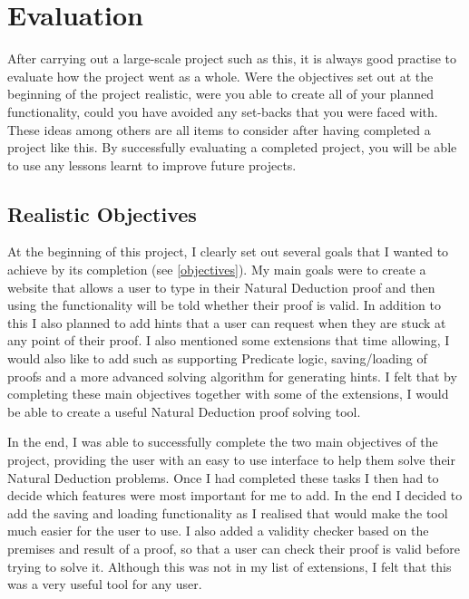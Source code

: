 \pagebreak

\section{Evaluation}

After carrying out a large-scale project such as this, it is always good practise to evaluate how the project went as a whole. Were the objectives set out at the beginning of the project realistic, were you able to create all of your planned functionality, could you have avoided any set-backs that you were faced with. These ideas among others are all items to consider after having completed a project like this. By successfully evaluating a completed project, you will be able to use any lessons learnt to improve future projects.

\subsection{Realistic Objectives}

At the beginning of this project, I clearly set out several goals that I wanted to achieve by its completion (see \ref{objectives}). My main goals were to create a website that allows a user to type in their Natural Deduction proof and then using the functionality will be told whether their proof is valid. In addition to this I also planned to add hints that a user can request when they are stuck at any point of their proof. I also mentioned some extensions that time allowing, I would also like to add such as supporting Predicate logic, saving/loading of proofs and a more advanced solving algorithm for generating hints. I felt that by completing these main objectives together with some of the extensions, I would be able to create a useful Natural Deduction proof solving tool.

In the end, I was able to successfully complete the two main objectives of the project, providing the user with an easy to use interface to help them solve their Natural Deduction problems. Once I had completed these tasks I then had to decide which features were most important for me to add. In the end I decided to add the saving and loading functionality as I realised that would make the tool much easier for the user to use. I also added a validity checker based on the premises and result of a proof, so that a user can check their proof is valid before trying to solve it. Although this was not in my list of extensions, I felt that this was a very useful tool for any user. 

